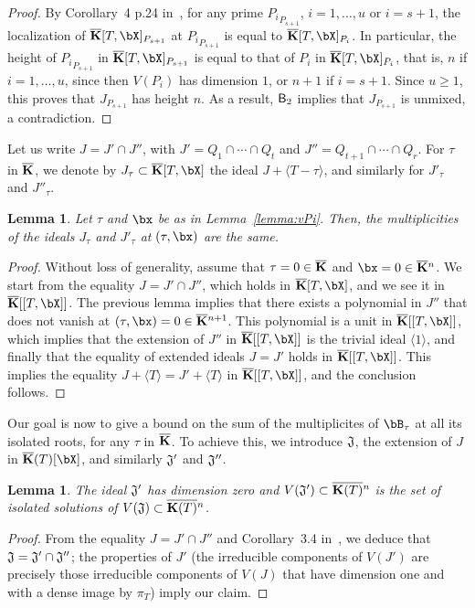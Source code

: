\documentclass[12pt]{article}
\newtheorem{lemma}[definition]{Lemma}
\begin{document}
\begin{proof}
  By Corollary~4 p.24 in~\cite{Matsumura86}, for any prime
  ${P_i}_{P_{s+1}}$, $i=1,\dots,u$ or $i=s+1$, the localization of
  $\KKbar[T,\bX]_{P_{s+1}}$ at ${P_i}_{P_{s+1}}$ is equal to
  $\KKbar[T,\bX]_{P_{i}}$. In particular, the height of ${P_i}_{P_{s+1}}$
  in $\KKbar[T,\bX]_{P_{s+1}}$ is equal to that of $P_i$ in
  $\KKbar[T,\bX]_{P_{i}}$, that is, $n$ if $i=1,\dots,u$, since then
  $V(P_i)$ has dimension $1$, or $n+1$ if $i=s+1$. Since $u \ge 1$,
  this proves that $J_{P_{s+1}}$ has height $n$. As a result, $\mathsf{B}_2$ implies that $J_{P_{s+1}}$ is unmixed, a contradiction.
\end{proof}

Let us write $J=J' \cap J''$, with $J'=Q_1 \cap \cdots \cap Q_t$ and
$J''=Q_{t+1} \cap \cdots \cap Q_r$. For $\tau$ in $\overline{\mathbf{K}}$, we denote
by $J_\tau \subset \KKbar[T,\bX]$ the ideal $J + \langle T-\tau \rangle$,
and similarly for $J'_\tau$ and $ J''_\tau$.

\begin{lemma}\label{lemma:JJprime}
  Let $\tau$ and $\bx$ be as in Lemma~\ref{lemma:vPi}. Then, the
  multiplicities of the ideals $J_\tau$ and $J'_\tau$ at $(\tau,\bx)$
  are the same.
\end{lemma}
\begin{proof}
  Without loss of generality, assume that $\tau=0 \in \overline{\mathbf{K}}$ and
  $\bx=0 \in \KKbar{}^n$. We start from the equality $J=J' \cap J''$,
  which holds in $\KKbar[T,\bX]$, and we see it in $\KKbar[[T,\bX]]$.  The
  previous lemma implies that there exists a polynomial in $J''$ that
  does not vanish at $(\tau,\bx)=0 \in \KKbar{}^{n+1}$.  This polynomial
  is a unit in $\KKbar[[T,\bX]]$, which implies that the extension of
  $J''$ in $\KKbar[[T,\bX]]$ is the trivial ideal $\langle 1 \rangle$, and
  finally that the equality of extended ideals $J=J'$ holds in
  $\KKbar[[T,\bX]]$. This implies the equality $J+\langle T \rangle
  =J'+\langle T \rangle $ in $\KKbar[[T,\bX]]$, and the conclusion
  follows.
\end{proof}

Our goal is now to give a bound on the sum of the multiplicites of
$\bB_\tau$ at all its isolated roots, for any $\tau$ in $\overline{\mathbf{K}}$.  To
achieve this, we introduce $\frak{J}$, the extension of $J$ in
$\KKbar(T)[\bX]$, and similarly $\frak{J}'$ and ${\frak J}''$.

\begin{lemma}
  The ideal $\frak{J}'$ has dimension zero and $V(\frak{J}') \subset
  \overline{\mathbf{K}(T)}{}^n$ is the set of isolated solutions of
  $V(\frak{J}) \subset \overline{\mathbf{K}(T)}{}^n$.
\end{lemma}
\begin{proof}
 From the equality $J=J' \cap J''$ and Corollary~3.4 in~\cite{AtMc},
 we deduce that $\frak{J}=\frak{J'} \cap \frak{J''}$; the properties
 of $J'$ (the irreducible components of $V(J')$ are precisely those
 irreducible components of $V(J)$ that have dimension one and with a
 dense image by $\pi_T$) imply our claim.
\end{proof}
\end{document}
